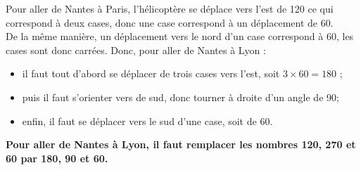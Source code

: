 Pour aller de Nantes à Paris, l'hélicoptère se déplace vers l'est de 120 ce qui correspond à deux cases, donc une case correspond à un déplacement de 60. \\
De la même manière, un déplacement vers le nord d'un case correspond à 60, les cases sont donc carrées. Donc, pour aller de Nantes à Lyon :
\begin{itemize}
   \item il faut tout d'abord se déplacer de trois cases vers l'est, soit $3\times60 =180$ ;
   \item  puis il faut s'orienter vers de sud, donc tourner à droite d'un angle de 90\degre ;
   \item enfin, il faut se déplacer vers le sud d'une case, soit de 60.
\end{itemize}
{\bf Pour aller de Nantes à Lyon, il faut remplacer les nombres 120, 270 et 60 par 180, 90 et 60.}
